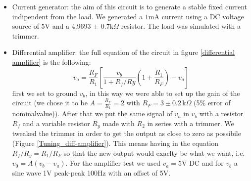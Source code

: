 \begin{itemize}
\item Current generator: the aim of this circuit is to generate a stable fixed current indipendent from the load. We generated a $1$mA current using a DC voltage source of 5V and a 4.9693 $\pm$ 0.7k$\Omega$ resistor. The load was simulated with a trimmer. 
\item Differential amplifier: the full equation of the circuit in figure \eqref{differential amplifier} is the following:
\[v_o = \frac{R_F}{R_1}\left[\frac{v_b}{1+R_f/Ry}\left(1+\frac{R_1}{R_F}\right)-v_a\right]\]
first we set to ground $v_b$, in this way we were able to set up the gain of the circuit (we chose it to be $A=\frac{R_F}{R_1}=2$ with $R_F =3\pm 0.2\, \text{k}\Omega$ (5\% error of nominalvalue)). After that we put the same signal of $v_a$ in $v_b$ with a resistor $R_f$ and a variable resistor $R_y$ made with $R_2$ in series with a trimmer. We tweaked the trimmer in order to get the output as close to zero as possibile (Figure \eqref{Tuning_diff-amplifier}). This means having in the equation $R_f/R_y = R_1/R_F$ so that the new output would exaclty be what we want, i.e. $v_0 = A(v_b-v_a)$. For the amplifier test we used $v_a= 5$V DC and for $v_b$ a sine wave 1V peak-peak 100Hz with an offset of 5V.
\end{itemize}
